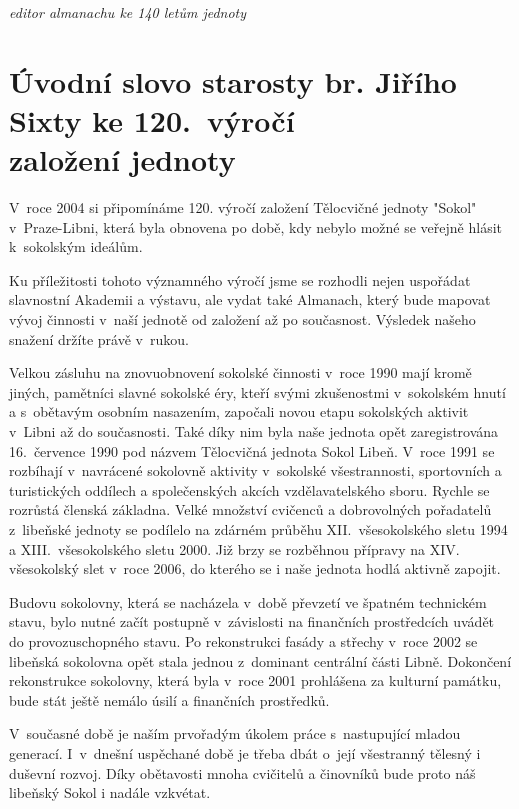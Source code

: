 \documentclass[a5paper, 11pt, twoside]{article}
\begin{document}
\hfill\textit{editor almanachu ke 140 letům jednoty}
\clearpage

\section{Úvodní slovo starosty br. Jiřího Sixty ke 120.~výročí\\založení jednoty}

V~roce 2004 si připomínáme 120. výročí založení Tělocvičné jednoty
"Sokol" v~Praze-Libni, která byla obnovena po době, kdy nebylo možné se
veřejně hlásit k~sokolským ideálům.

Ku příležitosti tohoto významného výročí jsme se rozhodli nejen
uspořádat slavnostní Akademii a výstavu, ale vydat také Almanach, který
bude mapovat vývoj činnosti v~naší jednotě od založení až po současnost.
Výsledek našeho snažení držíte právě v~rukou.

{\sloppy Velkou zásluhu na znovuobnovení sokolské činnosti v~roce 1990 mají kromě
jiných, pamětníci slavné sokolské éry, kteří svými zkušenostmi
v~sokolském hnutí a s~obětavým osobním nasazením, započali novou etapu
sokolských aktivit v~Libni až do současnosti. Také díky nim byla naše
jednota opět zaregistrována 16.~července 1990 pod názvem Tělocvičná
jednota Sokol Libeň. V~roce 1991 se rozbíhají v~navrácené sokolovně
aktivity v~sokolské všestrannosti, sportovních a turistických oddílech a
společenských akcích vzdělavatelského sboru. Rychle se rozrůstá členská
základna. Velké množství cvičenců a dobrovolných pořadatelů z~libeňské
jednoty se podílelo na zdárném průběhu XII.~všesokolského sletu 1994 a
XIII.~všesokolského sletu 2000. Již brzy se rozběhnou přípravy na XIV.
všesokolský slet v~roce 2006, do kterého se i naše jednota hodlá aktivně
zapojit. \par}

Budovu sokolovny, která se nacházela v~době převzetí ve špatném
technickém stavu, bylo nutné začít postupně v~závislosti na finančních
prostředcích uvádět do provozuschopného stavu. Po rekonstrukci fasády a
střechy v~roce 2002 se libeňská sokolovna opět stala jednou z~dominant
centrální části Libně. Dokončení rekonstrukce sokolovny, která byla
v~roce 2001 prohlášena za kulturní památku, bude stát ještě nemálo úsilí a
finančních prostředků.

V~současné době je naším prvořadým úkolem práce s~nastupující mladou
generací. I~v~dnešní uspěchané době je třeba dbát o~její všestranný
tělesný i duševní rozvoj. Díky obětavosti mnoha cvičitelů a činovníků
bude proto náš libeňský Sokol i nadále vzkvétat.
\end{document}
